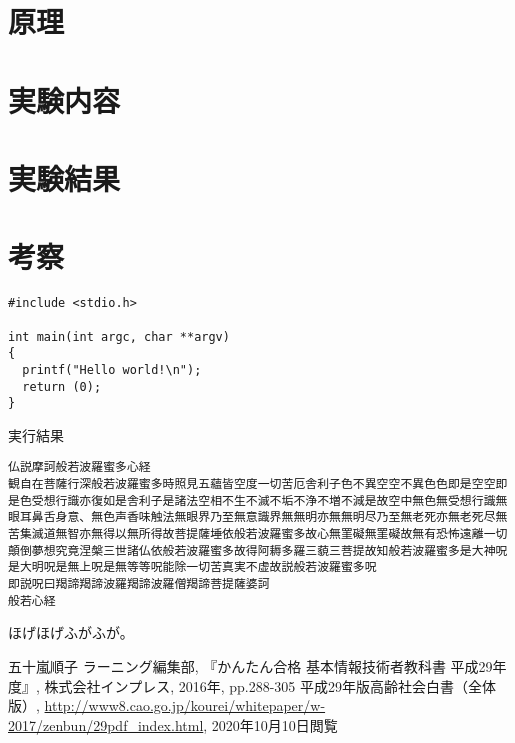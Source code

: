 \documentclass[a4j,uplatex]{jsarticle}
\begin{document}
\section{原理}
\section{実験内容}
\section{実験結果}
\section{考察}



\begin{lstlisting}[caption=main関数,label=src:main,xleftmargin=0zw]
#include <stdio.h>

int main(int argc, char **argv)
{
  printf("Hello world!\n");
  return (0);
}
\end{lstlisting}


% 


\begin{result}{実行結果}
\begin{verbatim}
仏説摩訶般若波羅蜜多心経
観自在菩薩行深般若波羅蜜多時照見五蘊皆空度一切苦厄舎利子色不異空空不異色色即是空空即是色受想行識亦復如是舎利子是諸法空相不生不滅不垢不浄不増不減是故空中無色無受想行識無眼耳鼻舌身意、無色声香味触法無眼界乃至無意識界無無明亦無無明尽乃至無老死亦無老死尽無苦集滅道無智亦無得以無所得故菩提薩埵依般若波羅蜜多故心無罣礙無罣礙故無有恐怖遠離一切顛倒夢想究竟涅槃三世諸仏依般若波羅蜜多故得阿耨多羅三藐三菩提故知般若波羅蜜多是大神呪是大明呪是無上呪是無等等呪能除一切苦真実不虚故説般若波羅蜜多呪
即説呪曰羯諦羯諦波羅羯諦波羅僧羯諦菩提薩婆訶
般若心経
\end{verbatim}
\end{result}


ほげほげ\cite{refer1}ふがふが\cite{refer2}。

\begin{thebibliography}{9}
   五十嵐順子 ラーニング編集部, 『かんたん合格 基本情報技術者教科書 平成29年度』, 株式会社インプレス, 2016年, pp.288-305
   平成29年版高齢社会白書（全体版）, \url{http://www8.cao.go.jp/kourei/whitepaper/w-2017/zenbun/29pdf_index.html}, 2020年10月10日閲覧
\end{thebibliography}
\end{document}
